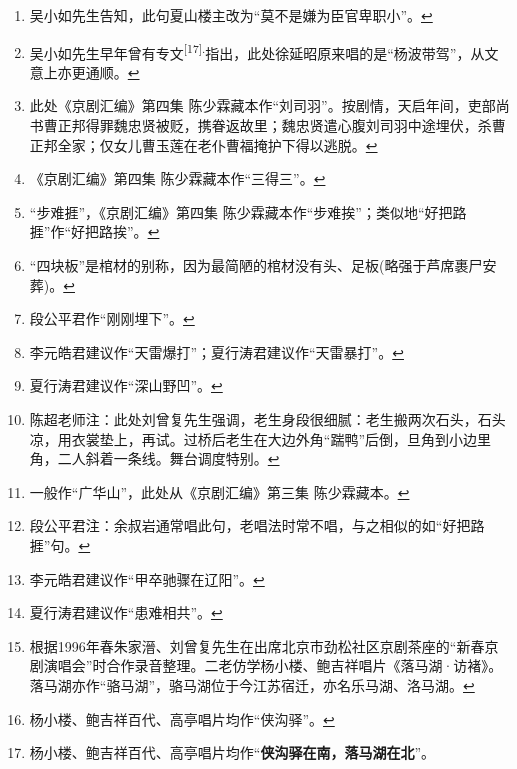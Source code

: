 \begin{enumerate}
  \protect\hyperlink{fnref607}{↩}
\item
  \leavevmode\hypertarget{fn608}{}%
  吴小如先生告知，此句夏山楼主改为``莫不是嫌为臣官卑职小''。\protect\hyperlink{fnref608}{↩}
\item
  \leavevmode\hypertarget{fn609}{}%
  吴小如先生早年曾有专文\textsuperscript{{[}17{]}.}指出，此处徐延昭原来唱的是``杨波带驾''，从文意上亦更通顺。\protect\hyperlink{fnref609}{↩}
\item
  \leavevmode\hypertarget{fn610}{}%
  此处《京剧汇编》第四集
  陈少霖藏本作``刘司羽''。按剧情，天启年间，吏部尚书曹正邦得罪魏忠贤被贬，携眷返故里；魏忠贤遣心腹刘司羽中途埋伏，杀曹正邦全家；仅女儿曹玉莲在老仆曹福掩护下得以逃脱。\protect\hyperlink{fnref610}{↩}
\item
  \leavevmode\hypertarget{fn611}{}%
  《京剧汇编》第四集
  陈少霖藏本作``三得三''。\protect\hyperlink{fnref611}{↩}
\item
  \leavevmode\hypertarget{fn612}{}%
  ``步难捱''，《京剧汇编》第四集
  陈少霖藏本作``步难挨''；类似地``好把路捱''作``好把路挨''。\protect\hyperlink{fnref612}{↩}
\item
  \leavevmode\hypertarget{fn613}{}%
  ``四块板''是棺材的别称，因为最简陋的棺材没有头、足板(略强于芦席裹尸安葬)。\protect\hyperlink{fnref613}{↩}
\item
  \leavevmode\hypertarget{fn614}{}%
  段公平君作``刚刚埋下''。\protect\hyperlink{fnref614}{↩}
\item
  \leavevmode\hypertarget{fn615}{}%
  李元皓君建议作``天雷爆打''；夏行涛君建议作``天雷暴打''。\protect\hyperlink{fnref615}{↩}
\item
  \leavevmode\hypertarget{fn616}{}%
  夏行涛君建议作``深山野凹''。\protect\hyperlink{fnref616}{↩}
\item
  \leavevmode\hypertarget{fn617}{}%
  陈超老师注：此处刘曾复先生强调，老生身段很细腻：老生搬两次石头，石头凉，用衣裳垫上，再试。过桥后老生在大边外角``踹鸭''后倒，旦角到小边里角，二人斜着一条线。舞台调度特别。\protect\hyperlink{fnref617}{↩}
\item
  \leavevmode\hypertarget{fn618}{}%
  一般作``广华山''，此处从《京剧汇编》第三集
  陈少霖藏本。\protect\hyperlink{fnref618}{↩}
\item
  \leavevmode\hypertarget{fn619}{}%
  段公平君注：余叔岩通常唱此句，老唱法时常不唱，与之相似的如``好把路捱''句。\protect\hyperlink{fnref619}{↩}
\item
  \leavevmode\hypertarget{fn620}{}%
  李元皓君建议作``甲卒驰骤在辽阳''。\protect\hyperlink{fnref620}{↩}
\item
  \leavevmode\hypertarget{fn621}{}%
  夏行涛君建议作``患难相共''。\protect\hyperlink{fnref621}{↩}
\item
  \leavevmode\hypertarget{fn622}{}%
  根据1996年春朱家溍、刘曾复先生在出席北京市劲松社区京剧茶座的``新春京剧演唱会''时合作录音整理。二老仿学杨小楼、鲍吉祥唱片《落马湖·访褚》。落马湖亦作``骆马湖''，骆马湖位于今江苏宿迁，亦名乐马湖、洛马湖。\protect\hyperlink{fnref622}{↩}
\item
  \leavevmode\hypertarget{fn623}{}%
  杨小楼、鲍吉祥百代、高亭唱片均作``侠沟驿''。\protect\hyperlink{fnref623}{↩}
\item
  \leavevmode\hypertarget{fn624}{}%
  杨小楼、鲍吉祥百代、高亭唱片均作``\textbf{侠沟驿在南，落马湖在北}''。


\end{enumerate}
